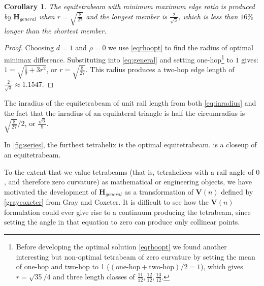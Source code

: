 \documentclass[twocolumn,10pt]{asme2ej}
\newtheorem{corollary}{Corollary}
\renewcommand{\vec}[1]{\mathbf{#1}}
\begin{document}
\begin{corollary}
  The equitetrabeam with minimum maximum edge ratio is produced
  \newline by $\vec{H}_{general}$ when $ r = \sqrt{\frac{8}{27}} $ and the longest member is $\frac{2}{\sqrt{3}}$,
  which is less than $16\%$ longer
  than the shortest member.
\end{corollary}

\begin{proof}
Choosing $d = 1$ and $\rho = 0$ we use  \cref{eqrhoopt} to find the radius of 
optimal minimax difference. Substituting into  \cref{eq:general} and setting one-hop\footnote{Before developing the optimal solution  \cref{eqrhoopt} we found another interesting but non-optimal tetrabeam of zero curvature
by setting
the mean of one-hop and two-hop to 1 ($(\text{one-hop} + \text{two-hop})/2 = 1$),
  which gives $r = \sqrt{35}/4$ and
  three length classes of $\frac{11}{12}, \frac{12}{12}, \frac{13}{12}$.}
 to $1$
gives:
$ 1  =  \sqrt{\frac{1}{9} + 3r^2} $, or $ r  = \sqrt{\frac{8}{27}}$. This radius
produces a two-hop edge length of $\frac{2}{\sqrt{3}} \approx 1.1547$.
\end{proof}


The inradius of the equitetrabeam of unit
rail length from both  \cref{eq:inradius} and the fact that the inradius of
an equilateral triangle is half the circumradius is $\sqrt{\frac{8}{27}}/2$, or $\frac{\sqrt{6}}{9}$.


In \cref{fig:series}, the furthest tetrahelix is the optimal equitetrabeam.
 is a closeup of an equitetrabeam.

To the extent that we value tetrabeams (that is, tetrahelices with a rail angle of $0$,
and therefore zero curvature) as mathematical or engineering objects,
we have motivated the development of $\vec{H}_{general}$ as a transformation of $\vec{V}(n)$ defined by
 \cref{graycoxeter} from Gray and Coxeter. It is difficult to see how
the $\vec{V}(n)$ 
formulation could ever give rise to a continuum producing the tetrabeam,
since setting the angle in that equation to zero can produce only collinear points.
\end{document}
